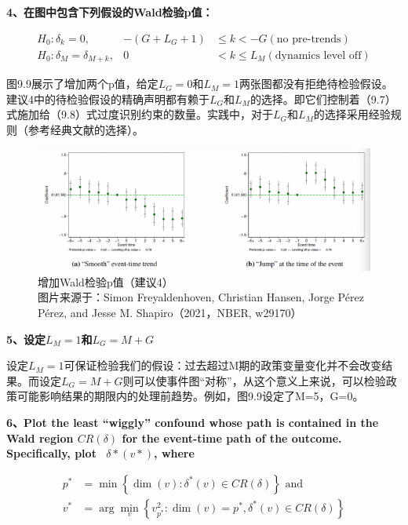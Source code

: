 \documentclass[cn,12pt,math=newtx,citestyle=gb7714-2015,bibstyle=gb7714-2015]{elegantbook}
\begin{document}
		\textbf{4、在图中包含下列假设的Wald检验p值：}
		
		$$
		\begin{array}{lrl}
			H_{0}: \delta_{k}=0, & -\left(G+L_{G}+1\right) & \leq k<-G (\text{no pre-trends})\\
			H_{0}: \delta_{M}=\delta_{M+k}, & 0 & <k \leq L_{M}  (\text{dynamics level off})
		\end{array}
		$$
		
		图9.9展示了增加两个p值，给定$L_G=0$和$L_M=1$两张图都没有拒绝待检验假设。建议4中的待检验假设的精确声明都有赖于$L_G$和$L_M$的选择。即它们控制着（9.7）式施加给（9.8）式过度识别约束的数量。实践中，对于$L_G$和$L_M$的选择采用经验规则（参考经典文献的选择）。
	
	\begin{figure}[tbph]
		\centering
		\includegraphics[width=1\linewidth]{sug4}
		\caption{增加Wald检验p值（建议4）\\ 图片来源于：Simon Freyaldenhoven, Christian Hansen, Jorge Pérez Pérez, and Jesse M. Shapiro（2021，NBER, w29170）}
		\label{fig:sug4}
	\end{figure}

	\textbf{5、设定$L_M=1$和$L_G=M+G$}
	
	设定$L_M=1$可保证检验我们的假设：过去超过M期的政策变量变化并不会改变结果。而设定$L_G=M+G$则可以使事件图“对称”，从这个意义上来说，可以检验政策可能影响结果的期限内的处理前趋势。例如，图9.9设定了M=5，G=0。


	\textbf{6、Plot the least “wiggly” confound whose path is contained in the Wald region $CR(\delta)$ for the event-time path of the outcome. Specifically, plot  $\delta*(v*)$, where}
		
		\begin{equation}
			\begin{aligned}
				p^{*} &=\min \left\{\operatorname{dim}(v): \delta^{*}(v) \in C R(\delta)\right\} \text { and } \\
				v^{*} &=\arg \min _{v}\left\{v_{p^{*}}^{2}: \operatorname{dim}(v)=p^{*}, \delta^{*}(v) \in C R(\delta)\right\}
			\end{aligned}
		\end{equation}
	
\end{document}
